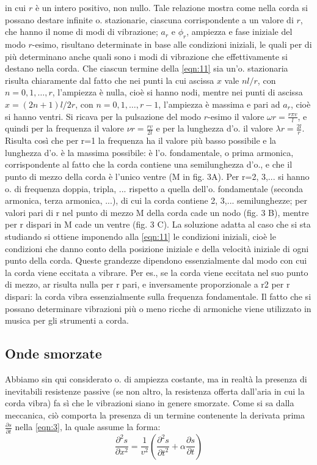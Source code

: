 \documentclass[a4paper]{article}
\begin{document}
in cui $r$ è un intero positivo, non nullo. Tale relazione mostra come nella corda si possano destare infinite o. stazionarie, ciascuna corrispondente a un valore di $r$, che hanno il nome di modi di vibrazione; $a_r$ e $\phi_r$, ampiezza e fase iniziale del modo $r$-esimo, risultano determinate in base alle condizioni iniziali, le quali per di più determinano anche quali sono i modi di vibrazione che effettivamente si destano nella corda. Che ciascun termine della \eqref{eqn:11} sia un'o. stazionaria risulta chiaramente dal fatto che nei punti la cui ascissa $x$ vale ${nl}/r$, con $n=0, 1,\ldots, r$, l'ampiezza è nulla, cioè si hanno nodi, mentre nei punti di ascissa $x=(2n+1)l/{2r}$, con $n=0, 1,\ldots, r-1$, l'ampiezza è massima e pari ad $a_r$, cioè si hanno ventri. Si ricava per la pulsazione del modo $r$-esimo il valore $\omega r=\frac{r\pi v}{l}$, e quindi per la frequenza il valore $\nu r=\frac{rv}{2l}$ e per la lunghezza d'o. il valore $\lambda r=\frac{2l}{r}$. 
Risulta così che per r=1 la frequenza ha il valore più basso possibile e la lunghezza d'o. è la massima possibile: è l'o. fondamentale, o prima armonica, corrispondente al fatto che la corda contiene una semilunghezza d'o., e che il punto di mezzo della corda è l'unico ventre (M in fig. 3A). Per r=2, 3,... si hanno o. di frequenza doppia, tripla, ... rispetto a quella dell'o. fondamentale (seconda armonica, terza armonica, ...), di cui la corda contiene 2, 3,... semilunghezze; per valori pari di r nel punto di mezzo M della corda cade un nodo (fig. 3 B), mentre per r dispari in M cade un ventre (fig. 3 C). La soluzione adatta al caso che si sta studiando si ottiene imponendo alla \eqref{eqn:11} le condizioni iniziali, cioè le condizioni che danno conto della posizione iniziale e della velocità iniziale di ogni punto della corda. Queste grandezze dipendono essenzialmente dal modo con cui la corda viene eccitata a vibrare. Per es., se la corda viene eccitata nel suo punto di mezzo, ar risulta nulla per r pari, e inversamente proporzionale a r2 per r dispari: la corda vibra essenzialmente sulla frequenza fondamentale. Il fatto che si possano determinare vibrazioni più o meno ricche di armoniche viene utilizzato in musica per gli strumenti a corda. 

\subsection{Onde smorzate} 
Abbiamo sin qui considerato o. di ampiezza costante, ma in realtà la presenza di inevitabili resistenze passive (se non altro, la resistenza offerta dall'aria in cui la corda vibra) fa sì che le vibrazioni siano in genere smorzate. Come si sa dalla meccanica, ciò comporta la presenza di un termine contenente la derivata prima $\frac{\partial s}{\partial t}$ nella \eqref{eqn:3}, la quale assume la forma: 
\begin{equation}
\frac{\partial^2 s}{\partial x^2}=\frac{1}{v^2}(\frac{\partial^2 s}{\partial t^2}+\alpha\frac{\partial s}{\partial t})
\end{equation}
\end{document}
